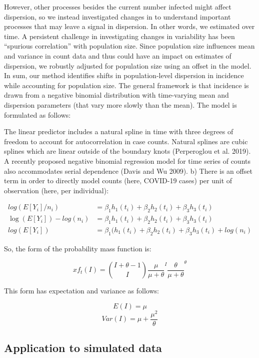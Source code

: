 \documentclass[10pt,letterpaper]{article}
\begin{document}
However, other processes besides the current number infected might affect dispersion, so we instead investigated changes in 
 to understand important processes that may leave a signal in dispersion. In other words, we estimated 
 over time. A persistent challenge in investigating changes in variability has been ``spurious correlation'' with population size. Since population size influences mean and variance in count data and thus could have an impact on estimates of dispersion, we robustly adjusted for population size using an offset in the model. In sum, our method identifies shifts in population-level dispersion in incidence while accounting for population size. The general framework is that incidence is drawn from a negative binomial distribution with time-varying mean and dispersion parameters (that vary more slowly than the mean). The model is formulated as follows:

 The linear predictor includes a natural spline in time with three degrees of freedom to account for autocorrelation in case counts. Natural splines are cubic splines which are linear outside of the boundary knots (Perperoglou et al. 2019). A recently proposed negative binomial regression model for time series of counts also accommodates serial dependence (Davis and Wu 2009). b) There is an offset term in order to directly model counts (here, COVID-19 cases) per unit of observation (here, per individual):

\begin{align}
  log(E[Y_i]/n_i) &= \beta_1h_1(t_i) + \beta_2h_2(t_i) + \beta_3h_3(t_i) \\
  \log(E[Y_i])-log(n_i) &= \beta_1h_1(t_i) + \beta_2h_2(t_i) + \beta_3h_3(t_i) \\ 
  log(E[Y_i]) &= \beta_1(h_1(t_i) + \beta_2h_2(t_i) + \beta_3h_3(t_i) + log(n_i) 
\end{align}

So, the form of the probability mass function is:

\begin{equation}
x  f_t(I) = \binom{I + \theta - 1}{I} \frac{\mu}{\mu+\theta}^I \frac{\theta}{\mu +\theta}^\theta
\end{equation}


This form has expectation and variance as follows:

$$E(I) = \mu$$
$$Var(I) = \mu + \frac{\mu^2}{\theta}$$

\subsection*{Application to simulated data}
\end{document}
